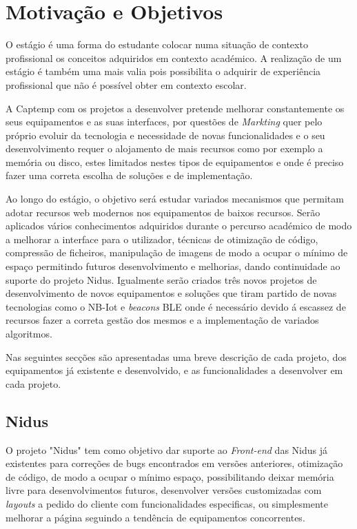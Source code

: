 \section{Motivação e Objetivos}
\par
O estágio é uma forma do estudante colocar numa situação de contexto profissional os conceitos adquiridos em contexto académico. A realização de um estágio é também uma mais valia pois possibilita o adquirir de experiência profissional que não é possível obter em contexto escolar.
\par
A Captemp com os projetos a desenvolver pretende melhorar constantemente os seus equipamentos e as suas interfaces, por questões de \textit{Markting} quer pelo próprio evoluir da tecnologia e necessidade de novas funcionalidades e o seu desenvolvimento requer o alojamento de mais recursos como por exemplo a memória ou disco, estes limitados nestes tipos de equipamentos e onde é preciso fazer uma correta escolha de soluções e de implementação. 
\par
Ao longo do estágio, o objetivo será estudar variados mecanismos que permitam adotar recursos web modernos nos equipamentos de baixos recursos. Serão aplicados vários conhecimentos adquiridos durante o percurso académico de modo a melhorar a interface para o utilizador, técnicas de otimização de código, compressão de ficheiros, manipulação de imagens de modo a ocupar o mínimo de espaço permitindo futuros desenvolvimento e melhorias, dando continuidade ao suporte do projeto Nidus. Igualmente serão criados três novos projetos de desenvolvimento de novos equipamentos e soluções que tiram partido de novas tecnologias como o NB-Iot e \textit{beacons} BLE onde é necessário devido á escassez de recursos fazer a correta gestão dos mesmos e a implementação de variados algoritmos.
\par
Nas seguintes secções são apresentadas uma breve descrição de cada projeto, dos equipamentos já existente e desenvolvido, e as funcionalidades a desenvolver em cada projeto.
\subsection{Nidus}
\par
O projeto "Nidus" tem como objetivo dar suporte ao \textit{Front-end} das Nidus já existentes para correções de bugs encontrados em versões anteriores, otimização de código, de modo a ocupar o mínimo espaço, possibilitando deixar memória livre para desenvolvimentos futuros, desenvolver versões customizadas com \textit{layouts} a pedido do cliente com funcionalidades especificas, ou simplesmente melhorar a página seguindo a tendência de equipamentos concorrentes.
